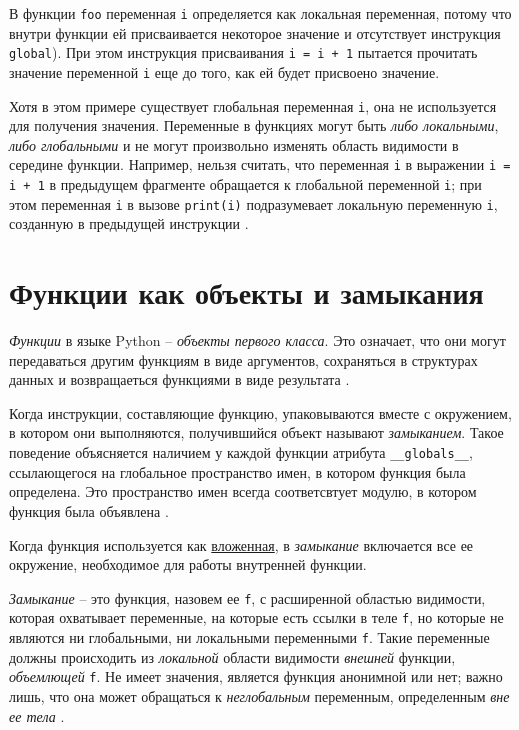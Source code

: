 \documentclass[%
	11pt,
	a4paper,
	utf8,
		]{article}
\begin{document}
В функции \texttt{foo} переменная \texttt{i} определяется как локальная переменная, потому что внутри функции ей присваивается некоторое значение и отсутствует инструкция \texttt{global}). При этом инструкция присваивания \texttt{i = i + 1} пытается прочитать значение переменной \texttt{i} еще до того, как ей будет присвоено значение. 

Хотя в этом примере существует глобальная переменная \texttt{i}, она не используется для получения значения. Переменные в функциях могут быть \emph{либо локальными}, \emph{либо глобальными} и не могут произвольно изменять область видимости в середине функции. Например, нельзя считать, что переменная \texttt{i} в выражении \texttt{i = i + 1} в предыдущем фрагменте обращается к глобальной переменной \texttt{i}; при этом переменная \texttt{i} в вызове \texttt{print(i)} подразумевает локальную переменную \texttt{i}, созданную в предыдущей инструкции \cite[]{beazley:python-2010}.

\section{Функции как объекты и замыкания}

\emph{Функции} в языке Python -- \emph{объекты первого класса}. Это означает, что они могут передаваться другим функциям в виде аргументов, сохраняться в структурах данных и возвращаеться функциями в виде результата \cite[]{beazley:python-2010}.

Когда инструкции, составляющие функцию, упаковываются вместе с окружением, в котором они выполняются, получившийся объект называют \emph{замыканием}. Такое поведение объясняется наличием у каждой функции атрибута \verb|__globals__|, ссылающегося на глобальное пространство имен, в котором функция была определена. Это пространство имен всегда соответсвтует модулю, в котором функция была объявлена \cite[]{beazley:python-2010}.

Когда функция используется как \underline{вложенная}, в \emph{замыкание} включается все ее окружение, необходимое для работы внутренней функции.

\emph{Замыкание} -- это функция, назовем ее \verb|f|, с расширенной областью видимости, которая охватывает переменные, на которые есть ссылки в теле \verb*|f|, но которые не являются ни глобальными, ни локальными переменными \verb*|f|. Такие переменные должны происходить из \emph{локальной} области видимости \emph{внешней} функции, \emph{объемлющей} \verb*|f|. Не имеет значения, является функция анонимной или нет; важно лишь, что она может обращаться к \emph{неглобальным} переменным, определенным \emph{вне ее тела} \cite[]{ramalho:python-2022}.
\end{document}
